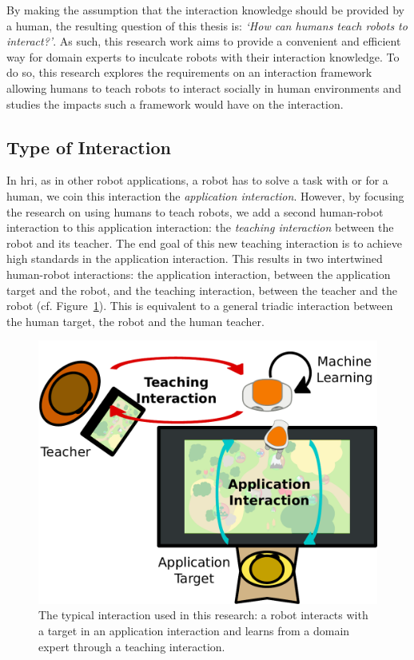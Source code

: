 By making the assumption that the interaction knowledge should be provided by a human, the resulting question of this thesis is: \emph{`How can humans teach robots to interact?'}. As such, this research work aims to provide a convenient and efficient way for domain experts to inculcate robots with their interaction knowledge. To do so, this research explores the requirements on an interaction framework allowing humans to teach robots to interact socially in human environments and studies the impacts such a framework would have on the interaction.

\subsection{Type of Interaction}

In \gls{hri}, as in other robot applications, a robot has to solve a task with or for a human, we coin this interaction the \emph{application interaction}. However, by focusing the research on using humans to teach robots, we add a second human-robot interaction to this application interaction: the \emph{teaching interaction} between the robot and its teacher. The end goal of this new teaching interaction is to achieve high standards in the application interaction. This results in two intertwined human-robot interactions: the application interaction, between the application target and the robot, and the teaching interaction, between the teacher and the robot (cf. Figure~\ref{fig:intro_setup}). This is equivalent to a general triadic interaction between the human target, the robot and the human teacher.

\begin{figure}[ht]
	\includegraphics[width=.7\linewidth]{setup.pdf}
	\centering
	\caption{The typical interaction used in this research: a robot interacts with a target in an application interaction and learns from a domain expert through a teaching interaction.}
	\label{fig:intro_setup}
\end{figure}

